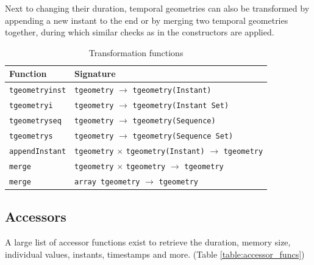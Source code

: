 Next to changing their duration, temporal geometries can also be transformed by appending a new instant to the end or by merging two temporal geometries together, during which similar checks as in the constructors are applied.

\begin{table}[htb]
    \centering
    \begin{tabularx}{\textwidth}{|l|X|}
    \hline
    \textbf{Function}   & \textbf{Signature} \\ 
    \hline
    \lstinline+tgeometryinst+       & \lstinline+tgeometry+ $\rightarrow$ \lstinline+tgeometry(Instant)+ \\
    \hline
    \lstinline+tgeometryi+          & \lstinline+tgeometry+ $\rightarrow$ \lstinline+tgeometry(Instant Set)+ \\
    \hline
    \lstinline+tgeometryseq+        & \lstinline+tgeometry+ $\rightarrow$ \lstinline+tgeometry(Sequence)+ \\
    \hline
    \lstinline+tgeometrys+          & \lstinline+tgeometry+ $\rightarrow$ \lstinline+tgeometry(Sequence Set)+ \\
    \hline
    \hline
    \lstinline+appendInstant+       & \lstinline+tgeometry+ $\times$ \lstinline+tgeometry(Instant)+ $\rightarrow$ \lstinline+tgeometry+ \\
    \hline
    \lstinline+merge+               & \lstinline+tgeometry+ $\times$ \lstinline+tgeometry+ $\rightarrow$ \lstinline+tgeometry+ \\
    \hline
    \lstinline+merge+               & \lstinline+array tgeometry+ $\rightarrow$ \lstinline+tgeometry+ \\
    \hline
    \end{tabularx}
    \caption{Transformation functions}
    \label{table:transformation_funcs}
\end{table}

\subsection{Accessors}
\label{section:accessors}

A large list of accessor functions exist to retrieve the duration, memory size, individual values, instants, timestamps and more. (Table \ref{table:accessor_funcs})

